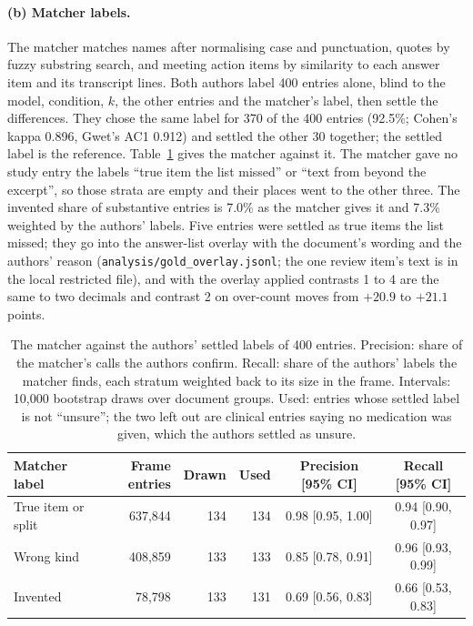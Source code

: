 \paragraph{(b) Matcher labels.}
The matcher matches names after normalising case and punctuation, quotes by fuzzy substring search, and meeting action items by similarity to each answer item and its transcript lines.
Both authors label 400 entries alone, blind to the model, condition, $k$, the other entries and the matcher's label, then settle the differences.
They chose the same label for 370 of the 400 entries (92.5\%; Cohen's kappa 0.896, Gwet's AC1 0.912) and settled the other 30 together; the settled label is the reference.
Table~\ref{tab:matchercheck} gives the matcher against it.
The matcher gave no study entry the labels ``true item the list missed'' or ``text from beyond the excerpt'', so those strata are empty and their places went to the other three.
The invented share of substantive entries is 7.0\% as the matcher gives it and 7.3\% weighted by the authors' labels.
Five entries were settled as true items the list missed; they go into the answer-list overlay with the document's wording and the authors' reason (\texttt{analysis/gold\_overlay.jsonl}; the one review item's text is in the local restricted file), and with the overlay applied contrasts 1 to 4 are the same to two decimals and contrast 2 on over-count moves from $+20.9$ to $+21.1$ points.

\begin{table}[t]
  \centering
  \small
  \begin{tabular}{@{}lrrrcc@{}}
    \toprule
    Matcher label & Frame entries & Drawn & Used & Precision [95\% CI] & Recall [95\% CI] \\
    \midrule
    True item or split & 637,844 & 134 & 134 & 0.98 [0.95, 1.00] & 0.94 [0.90, 0.97] \\
    Wrong kind & 408,859 & 133 & 133 & 0.85 [0.78, 0.91] & 0.96 [0.93, 0.99] \\
    Invented & 78,798 & 133 & 131 & 0.69 [0.56, 0.83] & 0.66 [0.53, 0.83] \\
    \bottomrule
  \end{tabular}
  \caption{The matcher against the authors' settled labels of 400 entries. Precision: share of the matcher's calls the authors confirm. Recall: share of the authors' labels the matcher finds, each stratum weighted back to its size in the frame. Intervals: 10,000 bootstrap draws over document groups. Used: entries whose settled label is not ``unsure''; the two left out are clinical entries saying no medication was given, which the authors settled as unsure.}
  \label{tab:matchercheck}
\end{table}

